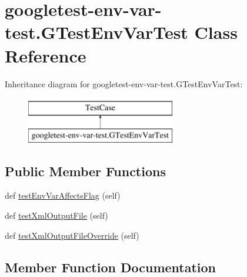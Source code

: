 \hypertarget{classgoogletest-env-var-test_1_1GTestEnvVarTest}{}\section{googletest-\/env-\/var-\/test.G\+Test\+Env\+Var\+Test Class Reference}
\label{classgoogletest-env-var-test_1_1GTestEnvVarTest}
Inheritance diagram for googletest-\/env-\/var-\/test.G\+Test\+Env\+Var\+Test\+:\begin{figure}[H]
\begin{center}
\leavevmode
\includegraphics[height=2.000000cm]{classgoogletest-env-var-test_1_1GTestEnvVarTest}
\end{center}
\end{figure}
\subsection*{Public Member Functions}
\begin{DoxyCompactItemize}
\item 
def \mbox{\hyperlink{classgoogletest-env-var-test_1_1GTestEnvVarTest_ae0165e3c30ce525c4d2f653e8f27ed3c}{test\+Env\+Var\+Affects\+Flag}} (self)
\item 
def \mbox{\hyperlink{classgoogletest-env-var-test_1_1GTestEnvVarTest_a6929a9194cdf872c02f6b2f3de9ff499}{test\+Xml\+Output\+File}} (self)
\item 
def \mbox{\hyperlink{classgoogletest-env-var-test_1_1GTestEnvVarTest_acf4114bec10759f9545f16846ce17f6f}{test\+Xml\+Output\+File\+Override}} (self)
\end{DoxyCompactItemize}


\subsection{Member Function Documentation}
\mbox{\label{classgoogletest-env-var-test_1_1GTestEnvVarTest_ae0165e3c30ce525c4d2f653e8f27ed3c}} 
